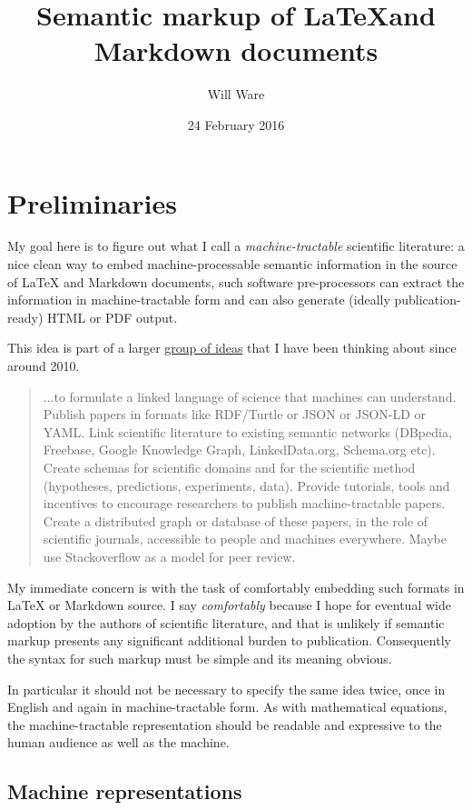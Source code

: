 \documentclass{article}
\title{Semantic markup of \LaTeX and Markdown documents}
\author{Will Ware}
\date{24 February 2016}
\begin{document}
\maketitle
\section {Preliminaries}
My goal here is to figure out what I call a \textit{machine-tractable} scientific literature:
a nice clean way to embed machine-processable semantic information in the source of LaTeX
and Markdown documents, such software pre-processors can extract the information in
machine-tractable form and can also generate (ideally publication-ready) HTML or PDF output.

This idea is part of a larger
\href{http://willware.blogspot.com/2013/10/bar-camp-boston-2013-talk-on-automation.html}{group of ideas}
that I have been thinking about since around 2010.

\begin{quotation}
...to formulate a linked language of science that machines can understand. Publish
papers in formats like RDF/Turtle or JSON or JSON-LD or YAML. Link scientific
literature to existing semantic networks (DBpedia, Freebase, Google Knowledge Graph,
LinkedData.org, Schema.org etc). Create schemas for scientific domains and for the
scientific method (hypotheses, predictions, experiments, data). Provide tutorials,
tools and incentives to encourage researchers to publish machine-tractable papers.
Create a distributed graph or database of these papers, in the role of scientific
journals, accessible to people and machines everywhere. Maybe use Stackoverflow as
a model for peer review.
\end{quotation}

My immediate concern is with the task of comfortably embedding such formats in LaTeX or
Markdown source. I say \textit{comfortably} because I hope for eventual wide adoption by
the authors of scientific literature, and that is unlikely if semantic markup presents any
significant additional burden to publication. Consequently the syntax for such markup must
be simple and its meaning obvious.

In particular it should not be necessary to specify the same idea twice, once in English
and again in machine-tractable form. As with mathematical equations, the machine-tractable
representation should be readable and expressive to the human audience as well as the
machine.

\subsection{Machine representations}
\end{document}
